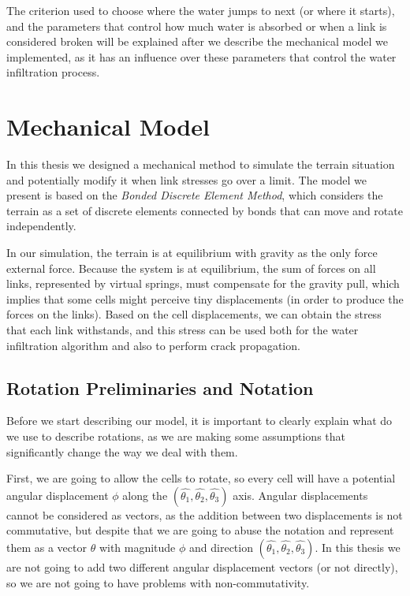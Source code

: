 \vspace{10pt}

The criterion used to choose where the water jumps to next (or where 
it starts), and the parameters that control how much water is absorbed or 
when a link is considered broken will be explained  
after we describe the mechanical model we implemented, as it has an influence 
over these parameters that control the water infiltration process.




\section{Mechanical Model}
In this thesis we designed a mechanical method to simulate the terrain 
situation and potentially modify it when link stresses go over a limit. 
The model we present is based on the \textit{Bonded Discrete Element Method},
which considers the terrain as a set of discrete elements connected by bonds
that can move and rotate independently.

\vspace{10pt}

In our simulation, the terrain is at equilibrium with gravity as the only 
force external force. Because the system is at equilibrium, the sum 
of forces on all links, represented by virtual springs, must compensate for 
the gravity pull, which implies that some cells might perceive tiny displacements
(in order to produce the forces on the links). Based on the cell displacements, we 
can obtain the stress that each link withstands, and this stress can be 
used both for the water infiltration algorithm and also to perform crack propagation.  

\subsection{Rotation Preliminaries and Notation}\label{sec:rotation}

Before we start describing our model, it is important to clearly 
explain what do we use to describe rotations, as we are making 
some assumptions that significantly change the way we deal with them.

\vspace{10pt}

First, we are going to allow the cells to rotate, so every cell will have
a potential angular displacement $\phi$ along the $(\hat{\theta_1}, \hat{\theta_2}, 
\hat{\theta_3})$ axis. Angular displacements cannot be considered as vectors,
as the addition between two displacements is not commutative, but despite 
that we are going to abuse the notation and represent them as a vector 
$\theta$ with magnitude $\phi$ and direction $(\hat{\theta_1}, \hat{\theta_2}, 
\hat{\theta_3})$. In this thesis we are not going to add two different angular 
displacement vectors (or not directly), so we are not going to have problems with 
non-commutativity.
\vspace{10pt}

